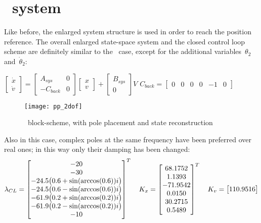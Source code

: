 \section{\twodof\ system}
Like before, the enlarged system structure is used in order to reach the position reference. The overall enlarged state-space system and the closed control loop scheme are definitely similar to the \onedof\ case, except for the additional variables~$\theta_2$ and~$\dot\theta_2$:
\begin{center}
	$\begin{bmatrix}
		\dot{x} \\
		\dot{v}
	\end{bmatrix}
	=
	\begin{bmatrix}
		A_{sys} & 0 \\
		-C_{back} & 0
	\end{bmatrix}
	\begin{bmatrix}
		x \\
		v
	\end{bmatrix}
	+
	\begin{bmatrix}
		B_{sys} \\
		0
	\end{bmatrix}
	V$		\qquad $ C_{back} =
	\begin{bmatrix}
		0 & 0 & 0 & 0 & -1 & 0
	\end{bmatrix}$
\end{center}
\begin{figure*}[h]
	\centering
	\texttt{[image: pp\_2dof]}
	\caption{\twodof\ block-scheme, with pole placement and state reconstruction}
\end{figure*}
Also in this case, complex poles at the same frequency have been preferred over real ones; in this way only their damping has been changed:
\begin{equation}
	\lambda_{CL} =
	\begin{bmatrix}
		-20 \\ -30 \\ -24.5 \bigl{(} 0.6+\sin(\arccos(0.6))i \bigr{)} \\ -24.5 \bigl{(} 0.6-\sin(\arccos(0.6))i \bigr{)} \\
		-61.9 \bigl{(} 0.2+\sin(\arccos(0.2))i \bigr{)} \\ -61.9 \bigl{(} 0.2-\sin(\arccos(0.2))i \bigr{)} \\ -10
	\end{bmatrix}^{T}
	\quad
	K_x =
	\begin{bmatrix}
		68.1752  \\  1.1393 \\ -71.9542 \\   0.0150 \\  30.2715  \\  0.5489
	\end{bmatrix}^{T}
	\quad
	K_v =
	\begin{bmatrix}
		110.9516
	\end{bmatrix}
\end{equation}

